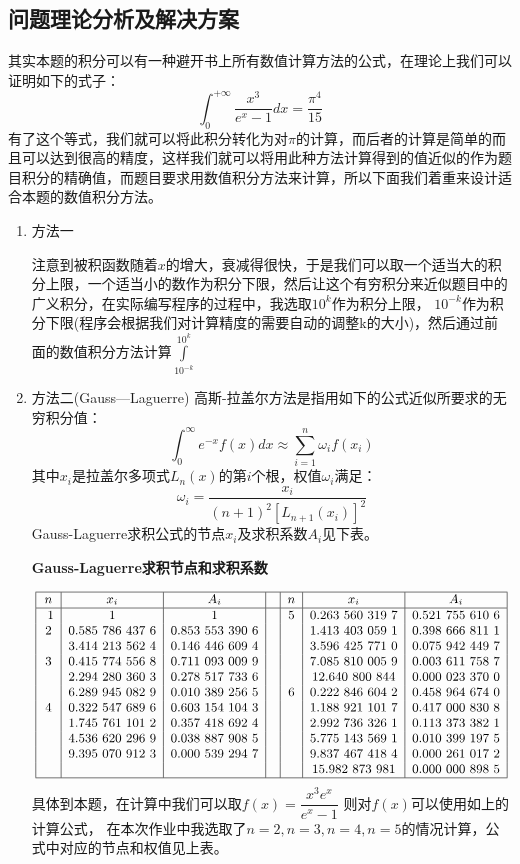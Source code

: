 \documentclass[10pt,a4paper]{ctexart}
\begin{document}
\subsection{问题理论分析及解决方案}
其实本题的积分可以有一种避开书上所有数值计算方法的公式，在理论上我们可以证明如下的式子：
\[\int_{0}^{+\infty}\dfrac{x^3}{e^x-1}dx=\dfrac{\pi^4}{15}\]
有了这个等式，我们就可以将此积分转化为对$\pi$的计算，而后者的计算是简单的而且可以达到很高的精度，这样我们就可以将用此种方法计算得到的值近似的作为题目积分的精确值，而题目要求用数值积分方法来计算，所以下面我们着重来设计适合本题的数值积分方法。
\begin{enumerate}
\item 方法一

注意到被积函数随着$x$的增大，衰减得很快，于是我们可以取一个适当大的积分上限，一个适当小的数作为积分下限，然后让这个有穷积分来近似题目中的广义积分，在实际编写程序的过程中，我选取$10^k$作为积分上限，
$10^{-k}$作为积分下限(程序会根据我们对计算精度的需要自动的调整k的大小)，然后通过前面的数值积分方法计算$\int\limits_{10^{-k}}^{10^k}$
\item 方法二(Gauss—Laguerre)
高斯-拉盖尔方法是指用如下的公式近似所要求的无穷积分值：
\[\int_{0}^{\infty}e^{-x}f(x)dx\approx \sum_{i=1}^{n}\omega_if(x_i)\]
其中$x_i$是拉盖尔多项式$L_n(x)$的第$i$个根，权值$\omega_i$满足：
\[\omega_i=\dfrac{x_i}{(n+1)^2[L_{n+1}(x_i)]^2}\]
Gauss-Laguerre求积公式的节点$x_i$及求积系数$A_i$见下表。
\begin{center}
\bf{Gauss-Laguerre求积节点和求积系数}
\end{center}
$$
\small\begin{array}{|c|c|c|c|c|c|c|}
\hline
n&x_i&A_i&&n&x_i&A_i\\
\hline \
1&1&1&&5&0.263~560~319~7&0.521~755~610~6\\
2&0.585~786~437~6&0.853~553~390~6&&&1.413~403~059~1&0.398~666~811~1\\
&3.414~213~562~4&0.146~446~609~4&&&3.596~425~771~0&0.075~942~449~7\\
3&0.415~774~556~8&0.711~093~009~9&&&7.085~810~005~9&0.003~611~758~7\\
&2.294~280~360~3&0.278~517~733~6&&&12.640~800~844&0.000~023~370~0\\
&6.289~945~082~9&0.010~389~256~5&&6&0.222~846~604~2&0.458~964~674~0\\
4&0.322~547~689~6&0.603~154~104~3&&&1.188~921~101~7&0.417~000~830~8\\
&1.745~761~101~2&0.357~418~692~4&&&2.992~736~326~1&0.113~373~382~1\\
&4.536~620~296~9&0.038~887~908~5&&&5.775~143~569~1&0.010~399~197~5\\
&9.395~070~912~3&0.000~539~294~7&&&9.837~467~418~4&0.000~261~017~2\\
&&&&&15.982~873~981&0.000~000~898~5\\
\hline
\end{array}
$$
具体到本题，在计算中我们可以取$f(x)=\dfrac{x^3e^x}{e^x-1}$
则对$f(x)$可以使用如上的计算公式，
在本次作业中我选取了$n=2,n=3,n=4,n=5$的情况计算，公式中对应的节点和权值见上表。

\end{enumerate}
\end{document}
